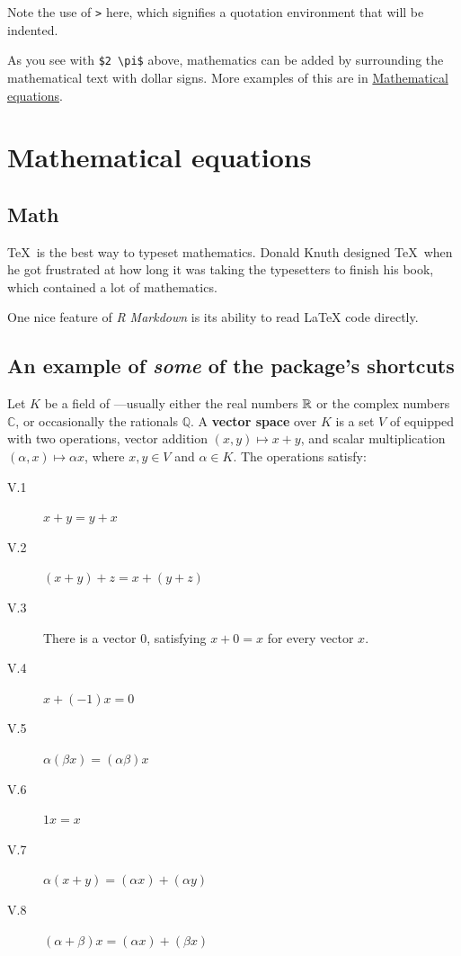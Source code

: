 \documentclass{article}
\newcommand{\idfn}[1]{{\boldmath\textbf{#1}}\index{#1}} %
\begin{document}
Note the use of \texttt{\textgreater{}} here, which signifies a
quotation environment that will be indented.

As you see with \texttt{\$2\ \textbackslash{}pi\$} above, mathematics
can be added by surrounding the mathematical text with dollar signs.
More examples of this are in
\protect\hyperlink{mathematical-equations}{Mathematical equations}.

\hypertarget{mathematical-equations}{%
\section{Mathematical equations}\label{mathematical-equations}}

\hypertarget{math}{%
\subsection{Math}\label{math}}

\TeX~is the best way to typeset mathematics. Donald Knuth designed
\TeX~when he got frustrated at how long it was taking the typesetters to
finish his book, which contained a lot of mathematics.

One nice feature of \emph{R Markdown} is its ability to read LaTeX code
directly.

\hypertarget{an-example-of-some-of-the-packages-shortcuts}{%
\subsection{\texorpdfstring{An example of \emph{some} of the package's
shortcuts}{An example of some of the package's shortcuts}}\label{an-example-of-some-of-the-packages-shortcuts}}

Let \(K\) be a field of
---usually either the
real numbers \(\mathbb R\) or the complex numbers \(\mathbb C\), or
occasionally the rationals \(\mathbb Q\). A \idfn{vector space} over
\(K\) is a set \(V\) of  equipped with two
operations, vector addition \((x,y)\mapsto x+y\), and scalar
multiplication \((\alpha,x)\mapsto \alpha x\), where \(x,y\in V\) and
\(\alpha\in K\). The operations satisfy:

\begin{description}
\item[V.1] $x+y=y+x$
\item[V.2] $(x+y)+z=x+(y+z)$
\item[V.3] There is a vector $0$, satisfying $x+0=x$ for every vector $x$.
\item[V.4] $x+(-1)x=0$
\item[V.5] $\alpha(\beta x)=(\alpha \beta)x$
\item[V.6] $1x=x$
\item[V.7] $\alpha(x+y)=(\alpha x)+(\alpha y)$
\item[V.8] $(\alpha+\beta)x=(\alpha x)+(\beta x)$
\end{description}
\end{document}
